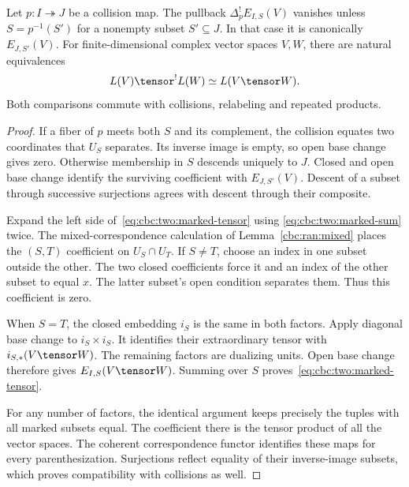 \begin{lemma}
\label{cbc:two:subsets}
Let $p:I\twoheadrightarrow J$ be a collision map.
The pullback $\Delta_p^!E_{I,S}(V)$ vanishes unless
$S=p^{-1}(S')$ for a nonempty subset $S'\subseteq J$.
In that case it is canonically $E_{J,S'}(V)$.
For finite-dimensional complex vector spaces $V,W$, there are natural equivalences
\begin{equation}
 L(V)\tensor^!L(W)\simeq L(V\tensor W).
 \label{eq:cbc:two:marked-tensor}
\end{equation}
Both comparisons commute with collisions, relabeling and repeated products.
\end{lemma}
\begin{proof}
If a fiber of $p$ meets both $S$ and its complement, the collision
equates two coordinates that $U_S$ separates.
Its inverse image is empty, so open base change gives zero.
Otherwise membership in $S$ descends uniquely to $J$.
Closed and open base change identify the surviving coefficient with
$E_{J,S'}(V)$. Descent of a subset through successive surjections agrees
with descent through their composite.

Expand the left side of~\eqref{eq:cbc:two:marked-tensor} using
\eqref{eq:cbc:two:marked-sum} twice.
The mixed-correspondence calculation of Lemma~\ref{cbc:ran:mixed}
places the $(S,T)$ coefficient on $U_S\cap U_T$.
If $S\ne T$, choose an index in one subset outside the other.
The two closed coefficients force it and an index of the other subset
to equal $x$. The latter subset's open condition separates them.
Thus this coefficient is zero.

When $S=T$, the closed embedding $i_S$ is the same in both factors.
Apply diagonal base change to $i_S\times i_S$.
It identifies their extraordinary tensor with $i_{S,*}(V\tensor W)$.
The remaining factors are dualizing units.
Open base change therefore gives $E_{I,S}(V\tensor W)$.
Summing over $S$ proves~\eqref{eq:cbc:two:marked-tensor}.

For any number of factors, the identical argument keeps precisely
the tuples with all marked subsets equal.
The coefficient there is the tensor product of all the vector spaces.
The coherent correspondence functor identifies these maps for every
parenthesization. Surjections reflect equality of their inverse-image
subsets, which proves compatibility with collisions as well.
\end{proof}

